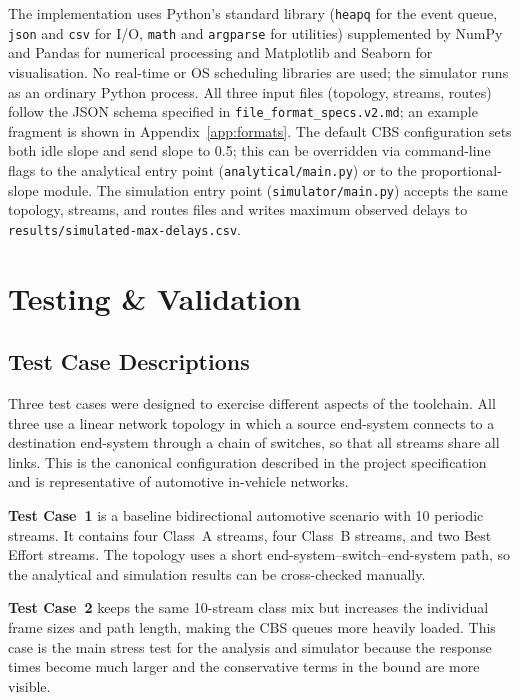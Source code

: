 \documentclass[11pt,a4paper]{article}
\begin{document}
The implementation uses Python's standard library (\texttt{heapq} for the
event queue, \texttt{json} and \texttt{csv} for I/O, \texttt{math} and
\texttt{argparse} for utilities) supplemented by NumPy and Pandas for
numerical processing and Matplotlib and Seaborn for visualisation.
No real-time or OS scheduling libraries are used; the simulator runs as an
ordinary Python process.
All three input files (topology, streams, routes) follow the JSON schema
specified in \texttt{file\_format\_specs.v2.md}; an example fragment is
shown in Appendix~\ref{app:formats}.
The default CBS configuration sets both idle slope and send slope to 0.5;
this can be overridden via command-line flags to the analytical entry point
(\texttt{analytical/main.py}) or to the proportional-slope module.
The simulation entry point (\texttt{simulator/main.py}) accepts the same
topology, streams, and routes files and writes maximum observed delays to
\texttt{results/simulated-max-delays.csv}.

\section{Testing \& Validation}

\subsection{Test Case Descriptions}

Three test cases were designed to exercise different aspects of the toolchain.
All three use a linear network topology in which a source end-system connects
to a destination end-system through a chain of switches, so that all streams
share all links.
This is the canonical configuration described in the project specification
\cite{proj} and is representative of automotive in-vehicle networks.

\textbf{Test Case~1} is a baseline bidirectional automotive scenario with
10 periodic streams.
It contains four Class~A streams, four Class~B streams, and two Best Effort
streams.
The topology uses a short end-system--switch--end-system path, so the
analytical and simulation results can be cross-checked manually.

\textbf{Test Case~2} keeps the same 10-stream class mix but increases the
individual frame sizes and path length, making the CBS queues more heavily
loaded.
This case is the main stress test for the analysis and simulator because the
response times become much larger and the conservative terms in the bound are
more visible.
\end{document}

